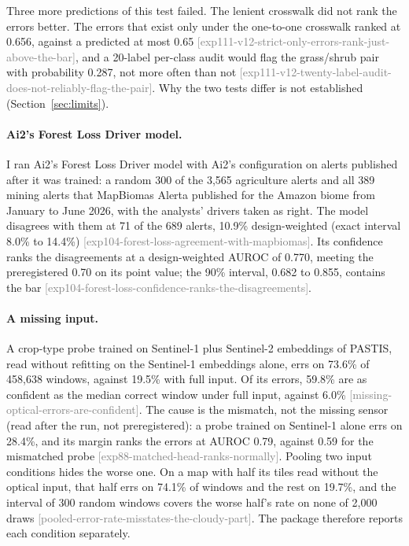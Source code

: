 \documentclass[11pt,a4paper]{article}
\newcommand{\claim}[1]{{\scriptsize\textsf{\textcolor{gray}{[#1]}}}}
\begin{document}
Three more predictions of this test failed. The lenient crosswalk did not rank the errors better. The errors that
exist only under the one-to-one crosswalk ranked at 0.656, against a predicted at most 0.65
\claim{exp111-v12-strict-only-errors-rank-just-above-the-bar}, and a 20-label per-class audit would flag the
grass/shrub pair with probability 0.287, not more often than not
\claim{exp111-v12-twenty-label-audit-does-not-reliably-flag-the-pair}. Why the two tests differ is not established
(Section~\ref{sec:limits}).

\paragraph{Ai2's Forest Loss Driver model.}
\label{sec:res-forestloss}
I ran Ai2's Forest Loss Driver model with Ai2's configuration on alerts published after it was trained: a random 300
of the 3,565 agriculture alerts and all 389 mining alerts that MapBiomas Alerta published for the Amazon biome from
January to June 2026, with the analysts' drivers taken as right. The model disagrees with them at 71 of the 689
alerts, 10.9\% design-weighted (exact interval 8.0\% to 14.4\%) \claim{exp104-forest-loss-agreement-with-mapbiomas}.
Its confidence ranks the disagreements at a design-weighted AUROC of 0.770, meeting the preregistered 0.70 on its
point value; the 90\% interval, 0.682 to 0.855, contains the bar
\claim{exp104-forest-loss-confidence-ranks-the-disagreements}.

\paragraph{A missing input.}
\label{sec:res-conditions}
A crop-type probe trained on Sentinel-1 plus Sentinel-2 embeddings of PASTIS, read without refitting on the
Sentinel-1 embeddings alone, errs on 73.6\% of 458,638 windows, against 19.5\% with full input. Of its errors, 59.8\%
are as confident as the median correct window under full input, against 6.0\%
\claim{missing-optical-errors-are-confident}. The cause is the mismatch, not the missing sensor (read after the run,
not preregistered): a probe trained on Sentinel-1 alone errs on 28.4\%, and its margin ranks the errors at AUROC
0.79, against 0.59 for the mismatched probe \claim{exp88-matched-head-ranks-normally}. Pooling two input conditions
hides the worse one. On a map with half its tiles read without the optical input, that half errs on 74.1\% of
windows and the rest on 19.7\%, and the interval of 300 random windows covers the worse half's rate on none of 2,000
draws \claim{pooled-error-rate-misstates-the-cloudy-part}. The package therefore reports each condition separately.
\end{document}
